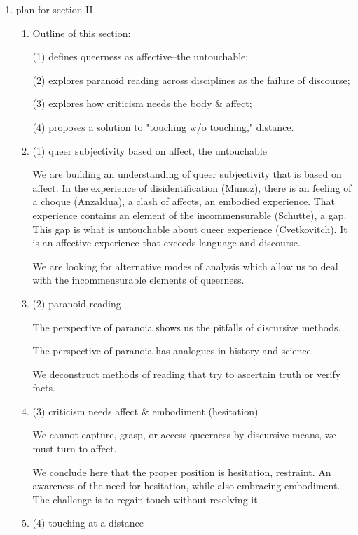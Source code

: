 \documentclass[11pt]{article}
\begin{document}
\begin{enumerate}
\item plan for section II
\label{sec:org4340adc}
\begin{enumerate}
\item Outline of this section:
\label{sec:orgd5b72da}

(1) defines queerness as affective--the untouchable; 

(2) explores paranoid reading across disciplines as the failure of
discourse;

(3) explores how criticism needs the body \& affect; 

(4) proposes a solution to "touching w/o touching," distance.

\item (1) queer subjectivity based on affect, the untouchable
\label{sec:org887c8bc}

We are building an understanding of queer subjectivity that is based
on affect. In the experience of disidentification (Munoz), there is an
feeling of a choque (Anzaldua), a clash of affects, an embodied
experience. That experience contains an element of the incommensurable
(Schutte), a gap. This gap is what is untouchable about queer
experience (Cvetkovitch). It is an affective experience that exceeds
language and discourse.

We are looking for alternative modes of analysis which allow us to
deal with the incommensurable elements of queerness.

\item (2) paranoid reading
\label{sec:org74dfbba}

The perspective of paranoia shows us the pitfalls of discursive
methods.      

The perspective of paranoia has analogues in history and science.

We deconstruct methods of reading that try to ascertain truth or
verify facts.

\item (3) criticism needs affect \& embodiment (hesitation)
\label{sec:orge09e5d1}

We cannot capture, grasp, or access queerness by discursive means, we
must turn to affect.

We conclude here that the proper position is hesitation, restraint. An
awareness of the need for hesitation, while also embracing
embodiment. The challenge is to regain touch without resolving it.

\item (4) touching at a distance
\label{sec:org5d9af99}


\end{enumerate}
\end{enumerate}
\end{document}
